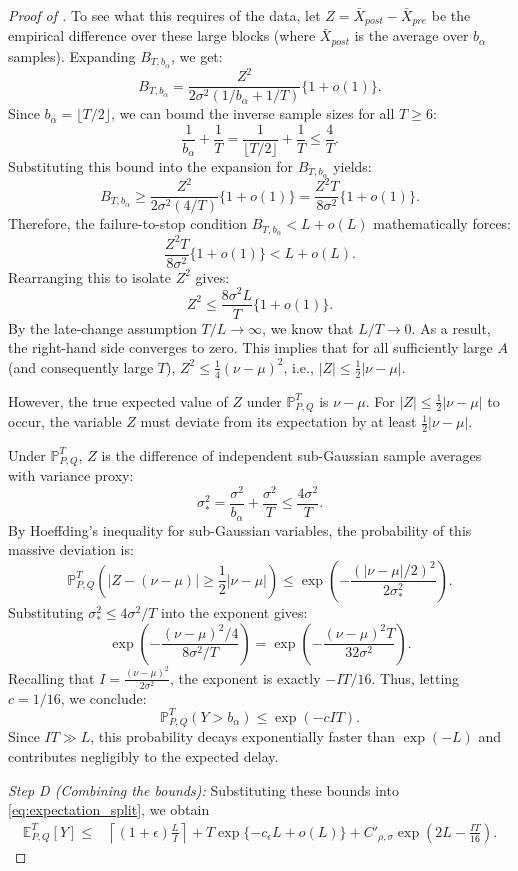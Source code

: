 \documentclass[12pt]{article}
\theoremstyle{spaced}
\theoremstyle{remark}
\begin{document}
\begin{proof}[Proof of ]
To see what this requires of the data, let $Z = \bar{X}_{post} - \bar{X}_{pre}$ be the empirical difference over these large blocks (where $\bar{X}_{post}$ is the average over $b_\alpha$ samples). Expanding $B_{T,b_\alpha}$, we get:
\[
    B_{T,b_\alpha} = \frac{Z^2}{2\sigma^2(1/b_\alpha + 1/T)}\{1+o(1)\}.
\]
Since $b_\alpha = \lfloor T/2 \rfloor$, we can bound the inverse sample sizes for all $T \ge 6$:
\[
    \frac{1}{b_\alpha} + \frac{1}{T} = \frac{1}{\lfloor T/2 \rfloor} + \frac{1}{T} \le \frac{4}{T}.
\]
Substituting this bound into the expansion for $B_{T,b_\alpha}$ yields:
\[
    B_{T,b_\alpha} \ge \frac{Z^2}{2\sigma^2 (4/T)} \{1+o(1)\} = \frac{Z^2 T}{8\sigma^2} \{1+o(1)\}.
\]
Therefore, the failure-to-stop condition $B_{T,b_\alpha} < L + o(L)$ mathematically forces:
\[
    \frac{Z^2 T}{8\sigma^2} \{1+o(1)\} < L + o(L).
\]
Rearranging this to isolate $Z^2$ gives:
\[
    Z^2 \le \frac{8\sigma^2 L}{T} \{1+o(1)\}.
\]
By the late-change assumption $T/L \to \infty$, we know that $L/T \to 0$. As a result, the right-hand side converges to zero. This implies that for all sufficiently large $A$ (and consequently large $T$), $Z^2 \le \frac{1}{4}(\nu-\mu)^2$, i.e., $|Z| \le \frac{1}{2}|\nu-\mu|$.

However, the true expected value of $Z$ under $\mathbb{P}^T_{P,Q}$ is $\nu - \mu$. For $|Z| \le \frac{1}{2}|\nu-\mu|$ to occur, the variable $Z$ must deviate from its expectation by at least $\frac{1}{2}|\nu-\mu|$. 

Under $\mathbb{P}^T_{P,Q}$, $Z$ is the difference of independent sub-Gaussian sample averages with variance proxy:
\[
    \sigma_*^2 = \frac{\sigma^2}{b_\alpha} + \frac{\sigma^2}{T} \le \frac{4\sigma^2}{T}.
\]
By Hoeffding's inequality for sub-Gaussian variables, the probability of this massive deviation is:
\[
    \mathbb{P}^T_{P,Q}\left( |Z - (\nu-\mu)| \ge \frac{1}{2}|\nu-\mu| \right) \le \exp\left( - \frac{(|\nu-\mu|/2)^2}{2\sigma_*^2} \right).
\]
Substituting $\sigma_*^2 \le 4\sigma^2/T$ into the exponent gives:
\[
    \exp\left( - \frac{(\nu-\mu)^2 / 4}{8\sigma^2 / T} \right) = \exp\left( - \frac{(\nu-\mu)^2 T}{32\sigma^2} \right).
\]
Recalling that $I = \frac{(\nu-\mu)^2}{2\sigma^2}$, the exponent is exactly $-I T / 16$. Thus, letting $c = 1/16$, we conclude:
\[
    \mathbb{P}^T_{P,Q}(Y > b_\alpha) \le \exp\left( - c I T \right).
\]
Since $IT \gg L$, this probability decays exponentially faster than $\exp(-L)$ and contributes negligibly to the expected delay.

\textit{Step D (Combining the bounds):} 
 Substituting these bounds into
\eqref{eq:expectation_split}, we obtain
\begin{align}
\mathbb E^T_{P,Q}[Y]
\le{}&
\left\lceil
(1+\epsilon)\frac{L}{I}
\right\rceil
+
T\exp\{-c_\epsilon L+o(L)\}
+
C'_{\rho,\sigma}
\exp\left(2L-\frac{IT}{16}\right).
\label{eq:expectation-combined}
\end{align}


\end{proof}
\end{document}
